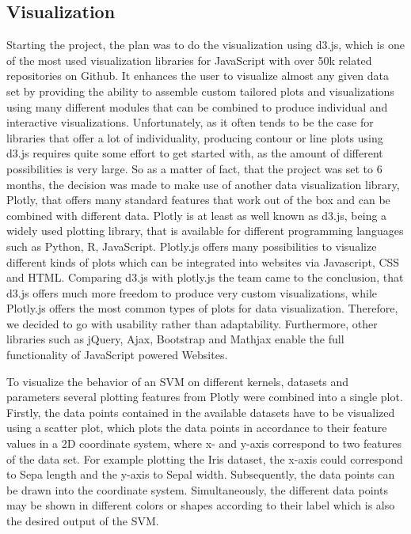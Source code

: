 \documentclass{scrartcl}
\begin{document}
\subsection{Visualization}

Starting the project, the plan was to do the visualization using d3.js, which is one of the most used visualization libraries for JavaScript with over 50k related repositories on Github. It enhances the user to visualize almost any given data set by providing the ability to assemble custom tailored plots and visualizations using many different modules that can be combined to produce individual and interactive visualizations. Unfortunately, as it often tends to be the case for libraries that offer a lot of individuality, producing contour or line plots using d3.js requires quite some effort to get started with, as the amount of different possibilities is very large. So as a matter of fact, that the project was set to 6 months, the decision was made to make use of another data visualization library, Plotly, that offers many standard features that work out of the box and can be combined with different data.
Plotly is at least as well known as d3.js, being a widely used plotting library, that is available for different programming languages such as Python, R, JavaScript. Plotly.js offers many possibilities to visualize different kinds of plots which can be integrated into websites via Javascript, CSS and HTML. Comparing d3.js with plotly.js the team came to the conclusion, that d3.js offers much more freedom to produce very custom visualizations, while Plotly.js offers the most common types of plots for data visualization. Therefore, we decided to go with usability rather than adaptability.
Furthermore, other libraries such as jQuery, Ajax, Bootstrap and Mathjax enable the full functionality of JavaScript powered Websites.


To visualize the behavior of an SVM on different kernels, datasets and parameters several plotting features from Plotly were combined into a single plot. 
Firstly, the data points contained in the available datasets have to be visualized using a scatter plot, which plots the data points in accordance to their feature values in a 2D coordinate system, where x- and y-axis correspond to two features of the data set. 
For example plotting the Iris dataset, the x-axis could correspond to Sepa length and the y-axis to Sepal width. Subsequently, the data points can be drawn into the coordinate system. Simultaneously, the different data points may be shown in different colors or shapes according to their label which is also the desired output of the SVM.
\end{document}
